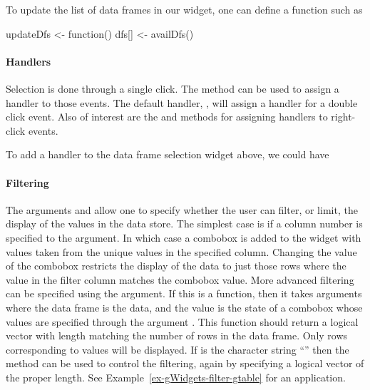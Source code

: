 To update the list of data frames in our  widget, one can define a function such as
\begin{Schunk}
\begin{Sinput}
 updateDfs <- function() {
   dfs[] <- availDfs()
 }
\end{Sinput}
\end{Schunk}


\paragraph{Handlers}
Selection is done through a single click. The 
method can be used to assign a handler to those events. The default
handler, , will assign a
handler for a double click event. Also of interest are the
 and
 methods for assigning handlers
to right-click events.


To add a handler to the data frame selection widget above, we could have
\begin{Schunk}
\end{Schunk}



\paragraph{Filtering}
The arguments  and
 allow one to specify whether the user
can filter, or limit, the display of the values in the data store. The
simplest case is if a column number is specified to the
 argument. In which case a combobox is added to
the widget with values taken from the unique values in the specified
column. Changing the value of the combobox restricts the display of
the data to just those rows where the value in the filter column
matches the combobox value. More advanced filtering can be specified
using the  argument. If this is a
function, then it takes arguments 
where the data frame is the data, and the  value is
the state of a combobox whose values are specified through the
argument . This function should return
a logical vector with length matching the number of rows in the data
frame.  Only rows corresponding to  values will be
displayed. If  is the character string
``'' then the  method can
be used to control the filtering, again by specifying a logical vector
of the proper length. See Example~\ref{ex-gWidgets-filter-gtable} for
an application.


